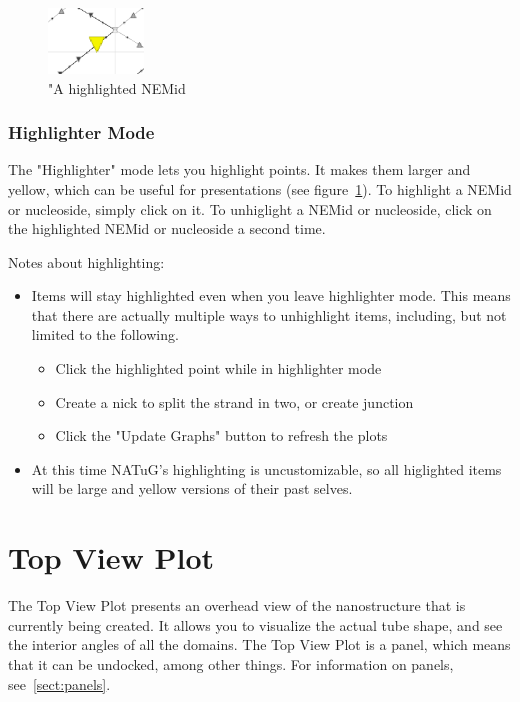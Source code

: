 \documentclass[titlepage]{article}
\begin{document}
	\begin{figure}
		\centering
		\includegraphics[width=1in]{highlighted-nemid.png}
		\caption{"A highlighted NEMid}
		\label{fig:highlighted-NEMid}
	\end{figure}

	\subsubsection{Highlighter Mode}

	The "Highlighter" mode lets you highlight points. It makes them larger and yellow, which can be useful for presentations (see figure~\ref{fig:highlighted-NEMid}). 
	To highlight a NEMid or nucleoside, simply click on it. To unhiglight a NEMid or nucleoside, click on the highlighted NEMid or nucleoside a second time.
	
	Notes about highlighting:
	\begin{itemize}
		\item Items will stay highlighted even when you leave highlighter mode. This means that there are actually multiple ways to unhighlight items, including, but not limited to the following.
		\begin{itemize}
			\item Click the highlighted point while in highlighter mode
			\item Create a nick to split the strand in two, or create junction
			\item Click the "Update Graphs" button to refresh the plots
		\end{itemize}
		\item At this time NATuG's highlighting is uncustomizable, so all higlighted items will be large and yellow versions of their past selves.
	\end{itemize}
	
	\section{Top View Plot}
	
	The Top View Plot presents an overhead view of the nanostructure that is currently being created. It allows you to visualize the actual tube shape, and see the interior angles of all the domains. The Top View Plot is a panel, which means that it can be undocked, among other things. For information on panels, see~\ref{sect:panels}.
	
\end{document}
